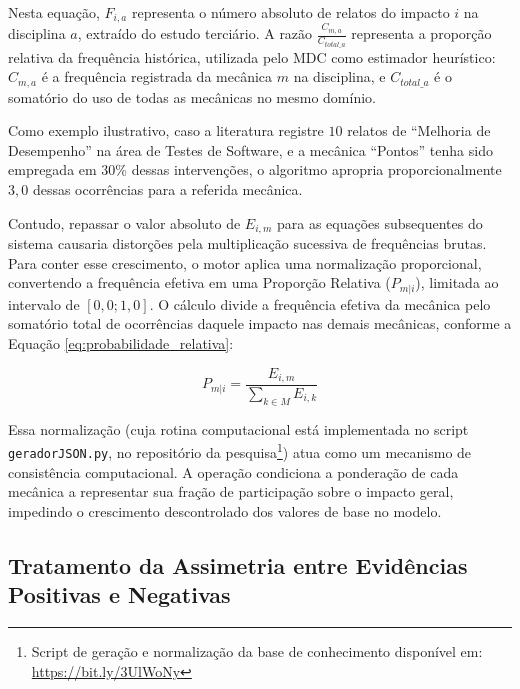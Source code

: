 Nesta equação, $F_{i,a}$ representa o número absoluto de relatos do impacto $i$ na disciplina $a$, extraído do estudo terciário. A razão $\frac{C_{m,a}}{C_{total\_a}}$ representa a proporção relativa da frequência histórica, utilizada pelo MDC como estimador heurístico: $C_{m,a}$ é a frequência registrada da mecânica $m$ na disciplina, e $C_{total\_a}$ é o somatório do uso de todas as mecânicas no mesmo domínio.

Como exemplo ilustrativo, caso a literatura registre $10$ relatos de ``Melhoria de Desempenho'' na área de Testes de Software, e a mecânica ``Pontos'' tenha sido empregada em $30\%$ dessas intervenções, o algoritmo apropria proporcionalmente $3,0$ dessas ocorrências para a referida mecânica.

Contudo, repassar o valor absoluto de $E_{i,m}$ para as equações subsequentes do sistema causaria distorções pela multiplicação sucessiva de frequências brutas. Para conter esse crescimento, o motor aplica uma normalização proporcional, convertendo a frequência efetiva em uma Proporção Relativa ($P_{m|i}$), limitada ao intervalo de $[0,0; 1,0]$. O cálculo divide a frequência efetiva da mecânica pelo somatório total de ocorrências daquele impacto nas demais mecânicas, conforme a Equação \ref{eq:probabilidade_relativa}:

\begin{equation} \label{eq:probabilidade_relativa}
P_{m|i} = \frac{E_{i,m}}{\sum_{k \in M} E_{i,k}}
\end{equation}

Essa normalização (cuja rotina computacional está implementada no script \texttt{geradorJSON.py}, no repositório da pesquisa\footnote{Script de geração e normalização da base de conhecimento disponível em: \url{https://bit.ly/3UlWoNy}}) atua como um mecanismo de consistência computacional. A operação condiciona a ponderação de cada mecânica a representar sua fração de participação sobre o impacto geral, impedindo o crescimento descontrolado dos valores de base no modelo.


\subsection{Tratamento da Assimetria entre Evidências Positivas e Negativas}

